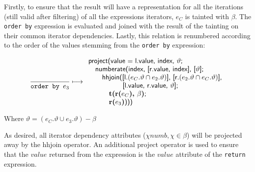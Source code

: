 Firstly, to ensure that the result will have a representation for all the iterations (still valid after filtering)
of all the expressions iterators, $e_C$ is tainted with $\beta$. The \texttt{order by} expression is evaluated and
joined with the result of the tainting on their common iterator dependencies. Lastly, this relation is renumbered
according to the order of the values stemming from the \texttt{order by} expression:

\begin{equation}
\frac{}{\mbox{\texttt{order by }}e_3}\longmapsto
\begin{array}{l}
\mbox{\textsf{project(value = l.value, index, }}\vartheta\mbox{\textsf{;}}\\ \quad
\mbox{\textsf{numberate(index, [r.value, index], [}}\vartheta\mbox{\textsf{];}} \\ \quad \quad
\mbox{\textsf{hhjoin([l.}}(e_{C}.\vartheta \cap e_2.\vartheta)\mbox{\textsf{], [r.}}(e_{2}.\vartheta \cap
e_{C}.\vartheta)\mbox{\textsf{],}} 
\\ \quad \quad \quad \quad \quad\mbox{\textsf{[l.value, r.value, }} \vartheta\mbox{\textsf{];}} \\ \quad \quad
\quad \mbox{\textbf{t(r(}}e_C\mbox{\textbf{), }}\beta\mbox{\textbf{)}\textsf{;}} \\ \quad \quad \quad
\mbox{\textbf{r(}}e_3\mbox{\textbf{)}\textsf{)))}}
\end{array}
\end{equation}

Where $\vartheta = (e_C.\vartheta \cup e_3.\vartheta)-\beta$

As desired, all iterator dependency attributes ($\chi{numb}, \chi \in \beta$) will be projected away by the
\textsf{hhjoin} operator. An additional \textsf{project} operator is used to ensure that the $value$ returned from
the expression is the $value$ attribute of the \texttt{return} expression.
